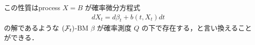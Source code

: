 \documentclass{jsarticle}
\begin{document}
この性質はprocess $X=B$ が確率微分方程式
\begin{align}
    dX_t=d\beta_t+b(t,X_t)dt
\end{align}
の解であるような $(\mathcal{F}_t)$-BM $\beta$ が確率測度 $Q$ の下で存在する，と言い換えることができる．
\end{document}
